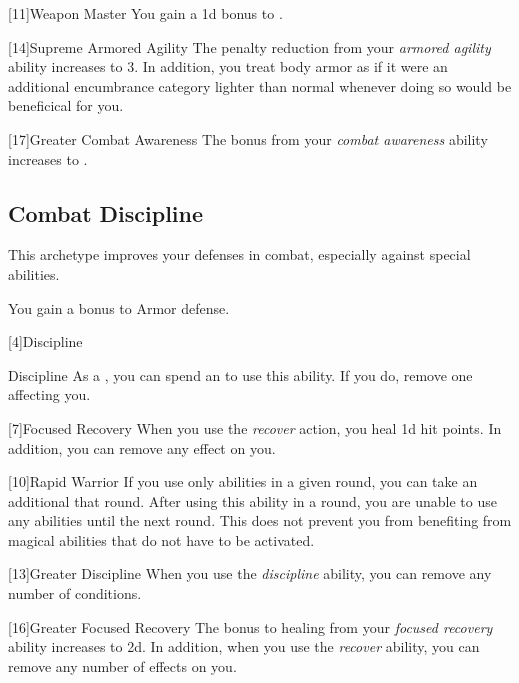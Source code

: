         [11]{Weapon Master} 
        You gain a \plus1d bonus to .

        [14]{Supreme Armored Agility}
        The penalty reduction from your \textit{armored agility} ability increases to 3.
        In addition, you treat body armor as if it were an additional encumbrance category lighter than normal whenever doing so would be beneficical for you.

        [17]{Greater Combat Awareness} 
        The bonus from your \textit{combat awareness} ability increases to .

    \subsection{Combat Discipline}
        This archetype improves your defenses in combat, especially against special abilities.

        You gain a  bonus to Armor defense.

        [4]{Discipline}
        \begin{ability}{Discipline}
            As a , you can spend an  to use this ability.
            If you do, remove one  affecting you.
        \end{ability}

        [7]{Focused Recovery}
        When you use the \textit{recover} action, you heal \plus1d hit points.
        In addition, you can remove any  effect on you.

        [10]{Rapid Warrior}
        If you use only  abilities in a given round, you can take an additional  that round.
        After using this ability in a round, you are unable to use any  abilities until the next round.
        This does not prevent you from benefiting from magical abilities that do not have to be activated.

        [13]{Greater Discipline}
        When you use the \textit{discipline} ability, you can remove any number of conditions.

        [16]{Greater Focused Recovery}
        The bonus to healing from your \textit{focused recovery} ability increases to \plus2d.
        In addition, when you use the \textit{recover} ability, you can remove any number of  effects on you.

